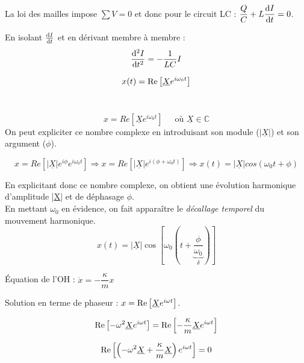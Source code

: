 \documentclass	[11pt, a4paper, openany]{book}
\begin{document}
La loi des mailles impose $\sum V = 0$ et donc pour le circuit LC : $\dfrac{Q}{C}+L\dfrac{\dif I}{\dif t}=0$.

En isolant $\frac{\dif I}{\dif t}$ et en dérivant membre à membre : $$ \dfrac{\dif^2 I}{\dif t^2} = -\dfrac{1}{LC} I $$


$$ x(t) = \RE \left[\phas{X}e^{i\omega_0t}\right] $$
\

$$x = Re\left[\underline{X}e^{i\omega_0 t} \right]\ \ \ \ \ \text{ où }\underline{X} \in \mathbb{C}$$
On peut expliciter ce nombre complexe en introduisant son module ($|\underline{X}|$) et son argument ($\phi$).

$$x = Re\left[|\underline{X}|e^{i\phi}e^{i\omega_0t}\right] \Rightarrow x = Re\left[|\underline{X}|e^{i(\phi + \omega_0 t)}\right] \Rightarrow x(t) = |\underline{X}|cos(\omega_0 t + \phi)$$

En explicitant donc ce nombre complexe, on obtient une évolution harmonique d'amplitude |\underline{X}| et de déphasage $\phi$.\\

En mettant $\omega_0$ en évidence, on fait apparaître le \textit{décallage temporel} du mouvement harmonique.
$$x(t) = |\underline{X}|\cos\left[\omega_0\left(t+\underbrace{\frac{\phi}{\omega_0}}_{\delta}\right)\right]$$



Équation de l'OH : $\ddot{x}=-\dfrac{\kappa}{m}x$

Solution en terme de phaseur : $x=\RE \left[ \phas{X}e^{i\omega t}\right]$.

$$\RE\left[ -\omega^2\phas{X}e^{i\omega t}\right] =\RE\left[ -\dfrac{\kappa}{m}\phas{X}e^{i\omega t}\right]$$

$$\RE \left[ \left( -\omega^2\phas{X}+\dfrac{\kappa}{m}\phas{X}\right) e^{i\omega t}\right] = 0$$
\end{document}

